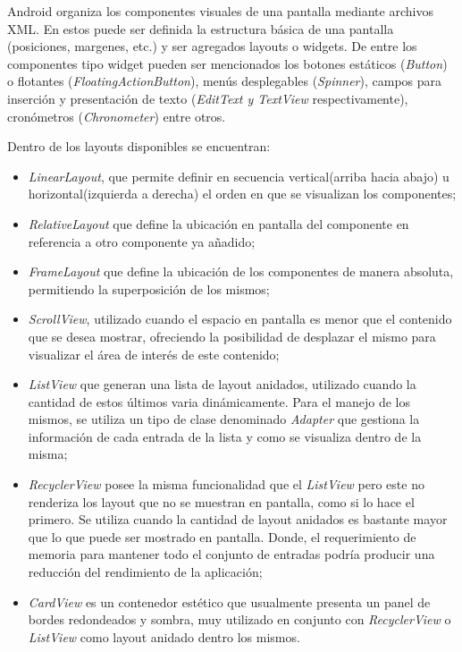     \par Android organiza los componentes visuales de una pantalla mediante archivos XML. En estos puede ser definida la estructura básica de una pantalla (posiciones, margenes, etc.) y ser agregados layouts o widgets. De entre los componentes tipo widget pueden ser mencionados los botones estáticos (\textit{Button}) o flotantes (\textit{FloatingActionButton}), menús desplegables (\textit{Spinner}), campos para inserción y presentación de texto (\textit{EditText y TextView} respectivamente), cronómetros (\textit{Chronometer}) entre otros.
    
    \par Dentro de los layouts disponibles se encuentran:
    
    \begin{itemize}
        \item \textit{LinearLayout}, que permite definir en secuencia vertical(arriba hacia abajo)  u horizontal(izquierda a derecha) el orden en que se visualizan los componentes;
        \item \textit{RelativeLayout} que define la ubicación en pantalla del componente en referencia a otro componente ya añadido;
        
        \item \textit{FrameLayout} que define la ubicación de los componentes de manera absoluta, permitiendo la superposición de los mismos;
        
        \item \textit{ScrollView}, utilizado cuando el espacio en pantalla es menor que el contenido que se desea mostrar, ofreciendo la posibilidad de desplazar el mismo para visualizar el área de interés de este contenido;
        
        \item \textit{ListView} que generan una lista de layout anidados, utilizado cuando la cantidad de estos últimos varia dinámicamente. Para el manejo de los mismos, se utiliza un tipo de clase denominado \textit{Adapter} que gestiona la información de cada entrada de la lista y como se visualiza dentro de la misma;
        
        \item \textit{RecyclerView} posee la misma funcionalidad que el \textit{ListView} pero este no renderiza los layout que no se muestran en pantalla, como si lo hace el primero. Se utiliza cuando la cantidad de layout anidados es bastante mayor que lo que puede ser mostrado en pantalla. Donde, el requerimiento de memoria para mantener todo el conjunto de entradas podría producir una reducción del rendimiento de la aplicación;
        
        \item \textit{CardView} es un contenedor estético que usualmente presenta un panel de bordes redondeados y sombra, muy utilizado en conjunto con \textit{RecyclerView} o \textit{ListView} como layout anidado dentro los mismos.
        
    \end{itemize}

